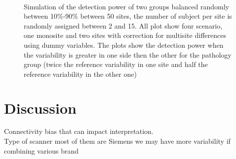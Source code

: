 \documentclass[authoryear]{elsarticle}
\begin{document}
\begin{figure}[t]
   \centering
    \captionsetup[subfloat]{labelformat=empty}
     \\
     \tiny Simulation of the detection power of two groups balanced randomly between 10\%-90\% between 50 sites, the number of subject per site is randomly assigned between 2 and 15. All plot show four scenario, one monosite and two sites with correction for multisite differences using dummy variables. The plots show the detection power when the variability is greater in one side then the other for the pathology group (twice the reference variability in one site and half the reference variability in the other one)
     \label{fig_full_sim_50sites_rnd_debalancing}
\end{figure}

\section{Discussion}

Connectivity bias that can impact interpretation.\\

Type of scanner most of them are Siemens we may have more variability if combining various brand\\
\end{document}

